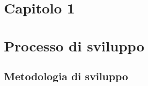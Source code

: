 	
    \maketitle
    \clearpage
	\tableofcontents
	\clearpage
	
    \section*{\Huge {Capitolo 1}\label{chapter1}}
      \section{Processo di sviluppo}\label{sec:process}
        \subsection {Metodologia di sviluppo}\label{subsec:metodology}
